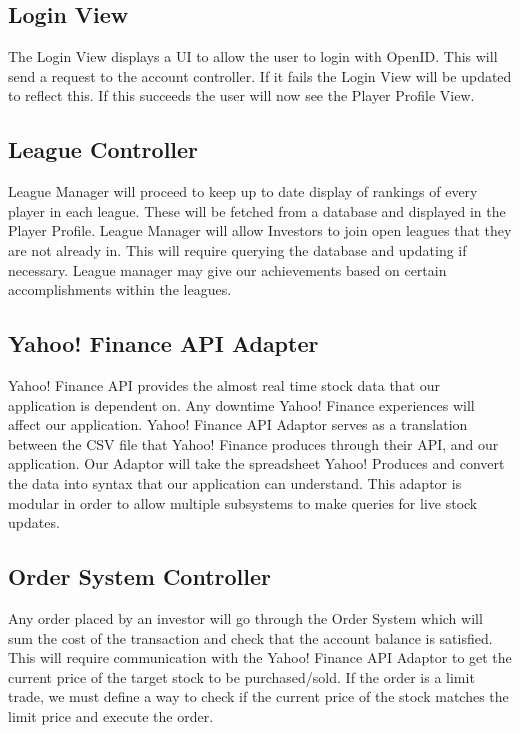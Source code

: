 \subsection{Login View}
The Login View displays a UI to allow the user to login with OpenID. This will send
a request to the account controller. If it fails the Login View will be updated to
reflect this. If this succeeds the user will now see the Player Profile View.\\

\subsection{League Controller}
League Manager will proceed to keep up to date display of rankings of every
player in each league. These will be fetched from a database and displayed
in the Player Profile. League Manager will allow Investors to join open
leagues that they are not already in. This will require querying the
database and updating if necessary. League manager may give our achievements
based on certain accomplishments within the leagues.\\

\subsection{Yahoo! Finance API Adapter}
Yahoo! Finance API provides the almost real time stock data that our
application is dependent on. Any downtime Yahoo! Finance experiences
will affect our application. Yahoo! Finance API Adaptor serves as a
translation between the CSV file that Yahoo! Finance produces through
their API, and our application. Our Adaptor will take the spreadsheet
Yahoo! Produces and convert the data into syntax that our application
can understand. This adaptor is modular in order to allow multiple
subsystems to make queries for live stock updates.\\

\subsection{Order System Controller}
Any order placed by an investor will go through the Order System which will
sum the cost of the transaction and check that the account balance is satisfied.
This will require communication with the Yahoo! Finance API Adaptor to get the
current price of the target stock to be purchased/sold. If the order is a limit
trade, we must define a way to check if the current price of the stock matches
the limit price and execute the order.\\

